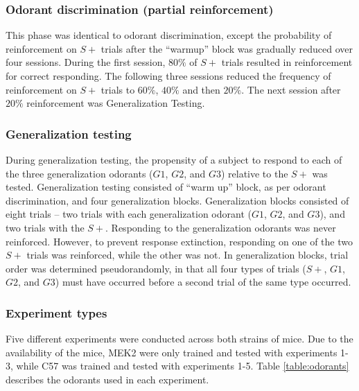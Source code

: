 \subsubsection{Odorant discrimination (partial reinforcement)}
\label{sec:methods_discrimination}
This phase was identical to odorant discrimination, except the probability of reinforcement on $S+$ trials after the ``warmup'' block was gradually reduced over four sessions. During the first session, $80\%$ of $S+$ trials resulted in reinforcement for correct responding. The following three sessions reduced the frequency of reinforcement on $S+$ trials to $60\%$, $40\%$ and then $20\%$. The next session after $20\%$ reinforcement was Generalization Testing.

\subsubsection{Generalization testing}
\label{sec:methods_training}
During generalization testing, the propensity of a subject to respond to each of the three generalization odorants ($G1$, $G2$, and $G3$) relative to the $S+$ was tested. Generalization testing consisted of ``warm up'' block, as per odorant discrimination, and four generalization blocks. Generalization blocks consisted of eight trials – two trials with each generalization odorant ($G1$, $G2$, and $G3$), and two trials with the $S+$. Responding to the generalization odorants was never reinforced. However, to prevent response extinction, responding on one of the two $S+$ trials was reinforced, while the other was not. In generalization blocks, trial order was determined pseudorandomly, in that all four types of trials ($S+$, $G1$, $G2$, and $G3$) must have occurred before a second trial of the same type occurred.

\subsubsection{Experiment types}
\label{sec:methods_experiment_types}
Five different experiments were conducted across both strains of mice. Due to the availability of the mice, MEK2 were only trained and tested with experiments 1-3, while C57 was trained and tested with experiments 1-5.  Table \ref{table:odorants} describes the odorants used in each experiment.

